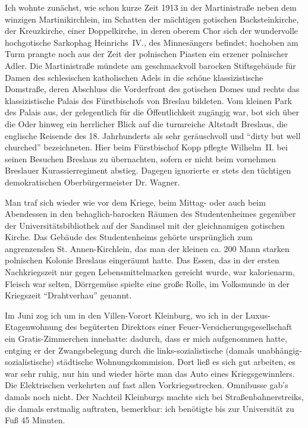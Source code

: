 Ich wohnte zunächst, wie schon kurze Zeit 1913 in der Martinistraße neben dem winzigen Martinikirchlein, im Schatten der mächtigen gotischen Backsteinkirche, der Kreuzkirche, einer Doppelkirche, in deren oberem Chor sich der wundervolle hochgotische Sarkophag Heinrichs~IV., des Minnesängers befindet; hochoben am Turm prangte noch aus der Zeit der polnischen Piasten ein erzener polnischer Adler. Die Martinistraße mündete am geschmackvoll barocken Stiftsgebäude für Damen des schlesischen katholischen Adels in die schöne klassizistische Domstraße, deren Abschluss die Vorderfront des gotischen Domes und rechts das klassizistische Palais des Fürstbischofs von Breslau bildeten. Vom kleinen Park des Palais aus, der gelegentlich für die Öffentlichkeit zugängig war, bot sich über die Oder hinweg ein herrlicher Blick auf die turmreiche Altstadt Breslaus, die englische Reisende des 18. Jahrhunderts als sehr geräuschvoll und \enquote{dirty but well churched} bezeichneten. Hier beim Fürstbischof Kopp pflegte Wilhelm~II. bei seinen Besuchen Breslaus zu übernachten, sofern er nicht beim vornehmen Breslauer Kurassierregiment abstieg. Dagegen ignorierte er stets den tüchtigen demokratischen Oberbürgermeister Dr. Wagner.

Man traf sich wieder wie vor dem Kriege, beim Mittag- oder auch beim Abendessen in den behaglich-barocken Räumen des Studentenheimes gegenüber der Universitätsbibliothek auf der Sandinsel mit der gleichnamigen gotischen Kirche. Das Gebäude des Studentenheims gehörte ursprünglich zum angrenzenden St. Annen-Kirchlein, das man der kleinen ca. 200 Mann starken polnischen Kolonie Breslaus eingeräumt hatte. Das Essen, das in der ersten Nachkriegszeit nur gegen Lebensmittelmarken gereicht wurde, war kalorienarm, Fleisch war selten, Dörrgemüse spielte eine große Rolle, im Volksmunde in der Kriegszeit \enquote{Drahtverhau} genannt.

Im Juni zog ich um in den Villen-Vorort Kleinburg, wo ich in der Luxus-Etagenwohnung des begüterten Direktors einer Feuer-Versicherungs\-ge\-sell\-schaft ein Gratis-Zimmerchen innehatte: dadurch, dass er mich aufgenommen hatte, entging er der Zwangsbelegung durch die links-sozialistische (damals un\-abh\-ängig-sozialistische) städtische Wohnungskommision. Dort ließ es sich gut arbeiten, es war sehr ruhig, nur hin und wieder hörte man das Auto eines Kriegsgewinnlers. Die Elektrischen verkehrten auf fast allen Vorkriegsstrecken. Omnibusse gab's damals noch nicht. Der Nachteil Kleinburgs machte sich bei Straßenbahnerstreiks, die damals erstmalig auftraten, bemerkbar: ich benötigte bis zur Universität zu Fuß 45 Minuten.


